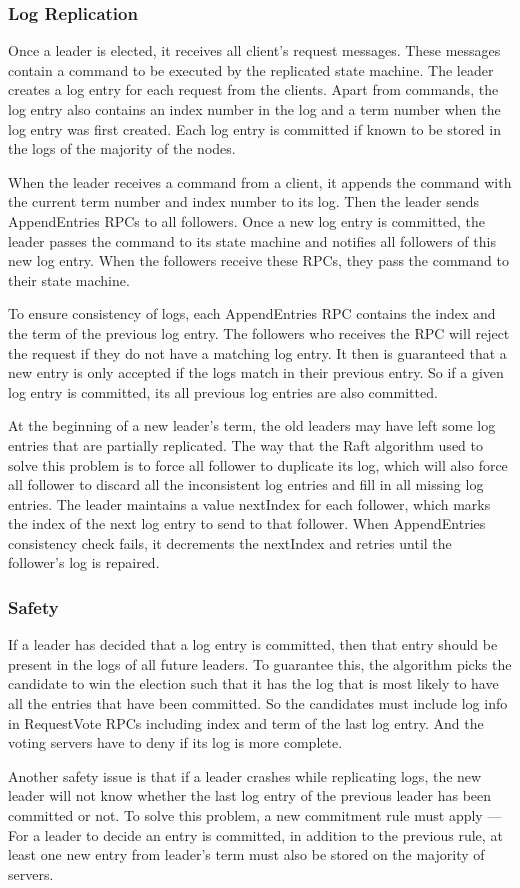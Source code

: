 \documentclass[12pt, a4paper]{article}
\begin{document}
  \subsubsection{Log Replication}
  Once a leader is elected, it receives all client's request messages. These messages contain a command to be executed by the replicated
  state machine. The leader creates a log entry for each request from the clients. Apart from commands, the log entry also contains an index
  number in the log and a term number when the log entry was first created. Each log entry is committed if known to be stored in the logs of
  the majority of the nodes.
  \par
  When the leader receives a command from a client, it appends the command with the current term number and index number to its log. Then the leader
  sends AppendEntries RPCs to all followers. Once a new log entry is committed, the leader passes the command to its state machine and
  notifies all followers of this new log entry. When the followers receive these RPCs, they pass the command to their state machine.
  \par
  To ensure consistency of logs, each AppendEntries RPC contains the index and the term of the previous log entry. The followers who receives the RPC will
  reject the request if they do not have a matching log entry. It then is guaranteed that a new entry is only accepted if the logs match in
  their previous entry. So if a given log entry is committed, its all previous log entries are also committed.
  \par
  At the beginning of a new leader's term, the old leaders may have left some log entries that are partially replicated. The way that the Raft
  algorithm used to solve this problem is to force all follower to duplicate its log, which will also force all follower to discard all the
  inconsistent log entries and fill in all missing log entries. The leader maintains a value nextIndex for each follower, which marks the index
  of the next log entry to send to that follower. When AppendEntries consistency check fails, it decrements the nextIndex and retries until the
  follower's log is repaired.
  \subsubsection{Safety}
  If a leader has decided that a log entry is committed, then that entry should be present in the logs of all future leaders\cite{conf/usenix/OngaroO14}. To guarantee this,
  the algorithm picks the candidate to win the election such that it has the log that is most likely to have all the entries that have been
  committed. So the candidates must include log info in RequestVote RPCs including index and term of the last log entry. And the voting servers
  have to deny if its log is more complete.
  \par
  Another safety issue is that if a leader crashes while replicating logs, the new leader will not know whether the last log entry of the
  previous leader has been committed or not. To solve this problem, a new commitment rule must apply --- For a leader to decide an entry
  is committed, in addition to the previous rule, at least one new entry from leader's term must also be stored on the majority of servers.
\end{document}
